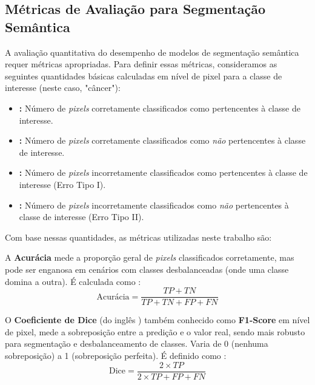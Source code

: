 \subsection{Métricas de Avaliação para Segmentação Semântica}\label{subsec:metricas_avaliacao}
A avaliação quantitativa do desempenho de modelos de segmentação semântica requer métricas apropriadas. Para definir essas métricas, consideramos as seguintes quantidades básicas calculadas em nível de pixel para a classe de interesse (neste caso, "câncer"):
\begin{itemize}
    \item \textbf{:} Número de \textit{pixels} corretamente classificados como pertencentes à classe de interesse.
    \item \textbf{:} Número de \textit{pixels} corretamente classificados como \textit{não} pertencentes à classe de interesse.
    \item \textbf{:} Número de \textit{pixels} incorretamente classificados como pertencentes à classe de interesse (Erro Tipo I).
    \item \textbf{:} Número de \textit{pixels} incorretamente classificados como \textit{não} pertencentes à classe de interesse (Erro Tipo II).
\end{itemize}


Com base nessas quantidades, as métricas utilizadas neste trabalho são:

A \textbf{Acurácia} mede a proporção geral de \textit{pixels} classificados corretamente, mas pode ser enganosa em cenários com classes desbalanceadas (onde uma classe domina a outra). É calculada como \cite{Muller2022}:
\begin{equation}\label{eq:acuracia}
    \text{Acurácia} = \frac{TP + TN}{TP + TN + FP + FN}
\end{equation}

O \textbf{Coeficiente de Dice} (do inglês ) também conhecido como \textbf{F1-Score} em nível de pixel, mede a sobreposição entre a predição e o valor real, sendo mais robusto para segmentação e desbalanceamento de classes. Varia de 0 (nenhuma sobreposição) a 1 (sobreposição perfeita). É definido como \cite{Muller2022}:
\begin{equation}\label{eq:dice}
    \text{Dice} = \frac{2 \times TP}{2 \times TP + FP + FN}
\end{equation}

